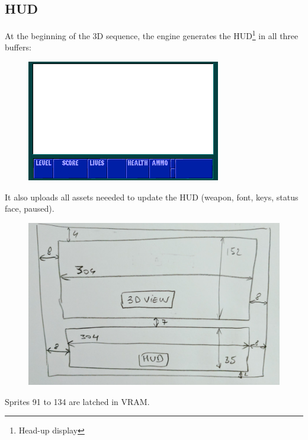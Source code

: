 \subsection{HUD}
At the beginning of the 3D sequence, the engine generates the HUD\footnote{Head-up display} in all three buffers:\\
\begin{figure}[H]
  \centering
 \includegraphics[width=\textwidth]{imgs/hud_empty.png}
\end{figure}
It also uploads all assets neeeded to update the HUD (weapon, font, keys, status face, paused).
\begin{figure}[H]
  \centering
 \includegraphics[width=\textwidth]{imgs/hud.png}
\end{figure}
Sprites 91 to 134 are latched in VRAM.\\


